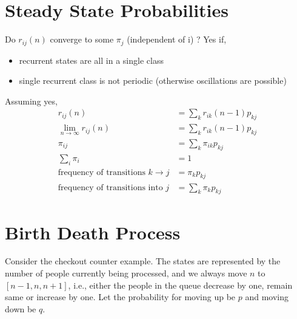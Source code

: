 \documentclass[../probability-notes.tex]{subfiles}
\begin{document}
    \section{Steady State Probabilities}
    \label{sec_markov_steady}
    Do $r_{ij}(n)$ converge to some $\pi_{j}$ (independent of i) ? \newline
    Yes if,
    \begin{itemize}
        \item recurrent states are all in a single class
        \item single recurrent class is not periodic (otherwise oscillations are possible)
    \end{itemize}
    Assuming yes,
    \begin{align*}
        r_{ij}(n) &= \sum_{k} r_{ik}(n-1)p_{kj}\\
        \lim_{n \to \infty} r_{ij}(n) &= \sum_{k} r_{ik}(n-1)p_{kj}\\
        \pi_{ij} &= \sum_{k} \pi_{ik} p_{kj} \tag*{balance equations} \\
        \sum_{i} \pi_{i} &= 1 \\
        \text{frequency of transitions $k \rightarrow j$} &= \pi_{k} p_{kj} \tag*{in one step}\\
        \text{frequency of transitions into $j$} &= \sum_{k} \pi_{k} p_{kj} \tag*{influx from all connected states}
    \end{align*}

    \section{Birth Death Process}
    Consider the checkout counter example. The states are represented by the number of people currently being processed, and we always move $n$ to $[n-1, n, n+1]$, i.e., either the people in the queue decrease by one, remain same or increase by one. Let the probability for moving up be $p$ and moving down be $q$.
\end{document}

